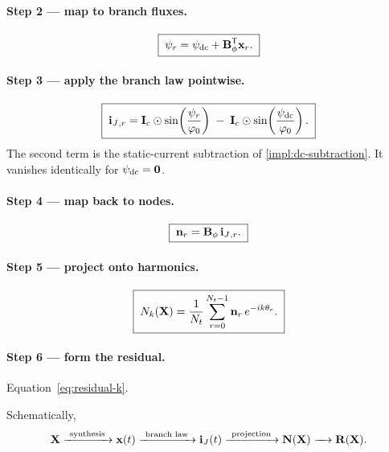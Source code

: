 \paragraph{Step 2 --- map to branch fluxes.}
\begin{equation}
  \boxed{\;\psi_r = \psi_{\mathrm{dc}} + \mathbf{B}_{\phi}^{\mathsf T}\mathbf{x}_r .\;}
  \label{eq:aft-2}
\end{equation}

\paragraph{Step 3 --- apply the branch law pointwise.}
\begin{equation}
  \boxed{\;
  \mathbf{i}_{J}{}_{,r} = \mathbf{I}_{c} \odot \sin\!\left(\frac{\psi_r}{\varphi_{0}}\right)
  \;-\;
  \mathbf{I}_{c} \odot \sin\!\left(\frac{\psi_{\mathrm{dc}}}{\varphi_{0}}\right) .
  \;}
  \label{eq:aft-3}
\end{equation}
The second term is the static-current subtraction of
\cref{impl:dc-subtraction}. It vanishes identically for
$\psi_{\mathrm{dc}}=\mathbf{0}$.

\paragraph{Step 4 --- map back to nodes.}
\begin{equation}
  \boxed{\;\mathbf{n}_r = \mathbf{B}_{\phi}\,\mathbf{i}_{J}{}_{,r} .\;}
  \label{eq:aft-4}
\end{equation}

\paragraph{Step 5 --- project onto harmonics.}
\begin{equation}
  \boxed{\;
  N_k(\mathbf{X})
  = \frac{1}{N_t}\sum_{r=0}^{N_t-1}\mathbf{n}_r\,e^{-ik\theta_r} .
  \;}
  \label{eq:aft-5}
\end{equation}

\paragraph{Step 6 --- form the residual.} Equation~\eqref{eq:residual-k}.

Schematically,
\begin{equation}
  \mathbf{X}
  \xrightarrow{\ \text{synthesis}\ } \mathbf{x}(t)
  \xrightarrow{\ \text{branch law}\ } \mathbf{i}_{J}(t)
  \xrightarrow{\ \text{projection}\ } \mathbf{N}(\mathbf{X})
  \xrightarrow{\quad} \mathbf{R}(\mathbf{X}).
\end{equation}

